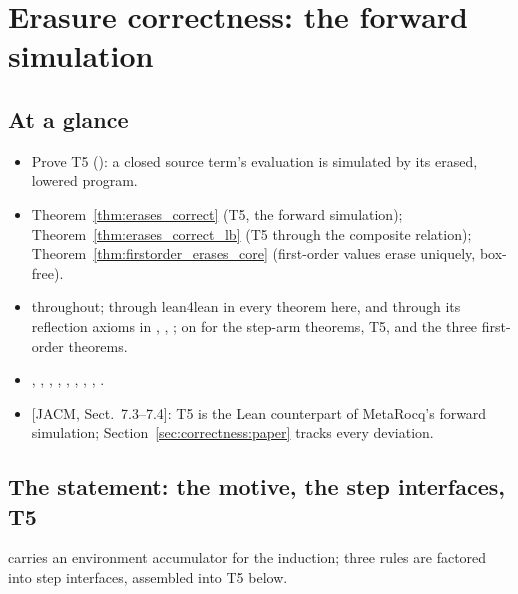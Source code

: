 \chapter{Erasure correctness: the forward simulation}
\label{chap:correctness}

\section*{At a glance}
\begin{itemize}
\item {} Prove T5 (): a closed source term's evaluation is simulated by its erased, lowered \lbox{} program.
\item {} Theorem~\ref{thm:erases_correct} (T5, the forward simulation); Theorem~\ref{thm:erases_correct_lb} (T5 through the composite relation); Theorem~\ref{thm:firstorder_erases_core} (first-order values erase uniquely, box-free).
\item {} \stProved{} throughout; \stInherited{} through lean4lean in every theorem here, and through its reflection axioms in , , ; \stAssumed{} on  for the step-arm theorems, T5, and the three first-order theorems.
\item {} , , , , , , , , .
\item {} [JACM, Sect.~7.3--7.4]: T5 is the Lean counterpart of MetaRocq's forward simulation; Section~\ref{sec:correctness:paper} tracks every deviation.
\end{itemize}

\section{The statement: the motive, the step interfaces, T5}
\label{sec:correctness:statement}

 carries an environment accumulator for the induction; three \SEval{} rules are factored
into step interfaces, assembled into T5 below.


